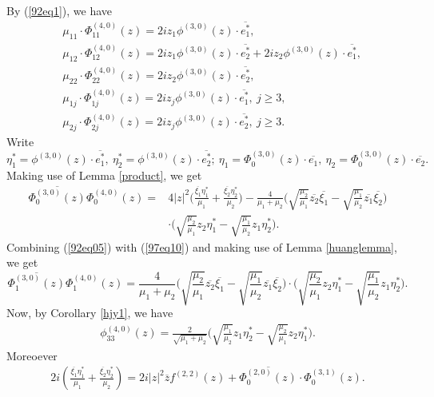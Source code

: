 \documentclass[12pt]{article}
\numberwithin{equation}{section}
\def\ov{\overline}
\begin{document}
By (\ref{92eq1}), we have
\begin{equation}\begin{split}\label{915eq1}
&\mu_{11}\cdot \Phi_{11}^{(4,0)}(z)=2iz_1\phi^{(3,0)}(z)\cdot \ov{e^*_1},\\
&\mu_{12}\cdot \Phi_{12}^{(4,0)}(z)=2iz_1\phi^{(3,0)}(z)\cdot \ov{e^*_2}+2iz_2\phi^{(3,0)}(z)\cdot \ov{e^*_1},\\
&\mu_{22}\cdot \Phi_{22}^{(4,0)}(z)=2iz_2\phi^{(3,0)}(z)\cdot \ov{e^*_2},\\
&\mu_{1j}\cdot \Phi_{1j}^{(4,0)}(z)=2iz_j\phi^{(3,0)}(z)\cdot \ov{e^*_1},\  j\ge 3,\\
&\mu_{2j}\cdot \Phi_{2j}^{(4,0)}(z)=2iz_j\phi^{(3,0)}(z)\cdot
\ov{e^*_2},\  j\ge 3.
\end{split}\end{equation}
Write
$$
\eta^*_1=\phi^{(3,0)}(z)\cdot \ov{e^*_1},\
\eta^*_2=\phi^{(3,0)}(z)\cdot \ov{e^*_2};\
\eta_1=\Phi_0^{(3,0)}(z)\cdot \ov{e_1},\
\eta_2=\Phi_0^{(3,0)}(z)\cdot \ov{e_2}.
$$
Making use of Lemma \ref{product}, we get
\begin{equation}\begin{split}\label{97eq10}
\ov{\Phi_0^{(3,0)}(z)}\Phi_0^{(4,0)}(z)
       =&4|z|^2\Big(\frac{\ov{\xi_1}\eta^*_1}{\mu_1}+\frac{\ov{\xi_2}\eta^*_2}{\mu_2}\Big)-\frac{4}{\mu_1+\mu_2}
        \Big(\sqrt{\frac{\mu_2}{\mu_1}}\ov{z_2}\ov{\xi_1}-\sqrt{\frac{\mu_1}{\mu_2}}\ov{z_1}\ov{\xi_2}\Big)\\&
        \cdot
         \Big(\sqrt{\frac{\mu_2}{\mu_1}}z_2\eta^*_1-\sqrt{\frac{\mu_1}{\mu_2}}z_1\eta^*_2\Big).
\end{split}\end{equation}
Combining (\ref{92eq05}) with (\ref{97eq10}) and making use of Lemma
\ref{huanglemma}, we get
\[
\ov{\Phi_{1}^{(3,0)}(z)}\Phi_{1}^{(4,0)}(z)=\frac{4}{\mu_1+\mu_2}
        \big(\sqrt{\frac{\mu_2}{\mu_1}}\ov{z_2}\ov{\xi_1}-\sqrt{\frac{\mu_1}{\mu_2}}\ov{z_1}\ov{\xi_2}\big)\cdot
         \big(\sqrt{\frac{\mu_2}{\mu_1}}z_2\eta^*_1-\sqrt{\frac{\mu_1}{\mu_2}}z_1\eta^*_2\big).
  \]
Now, by Corollary \ref{hjy1}, we have
\begin{equation}\begin{split}\label{99eq1}
\phi_{33}^{(4,0)}(z)=
\frac{2}{\sqrt{\mu_1+\mu_2}}\big(\sqrt{\frac{\mu_1}{\mu_2}}z_1\eta^*_2-\sqrt{\frac{\mu_2}{\mu_1}}z_2\eta^*_1\big).
\end{split}\end{equation}
Moreoever
\begin{equation}\begin{split}
2i(\frac{\ov{\xi_1}\eta^*_1}{\mu_1}+\frac{\ov{\xi_2}\eta^*_2}{\mu_2})
=2i|z|^2\ov{z}f^{(2,2)}(z)+\ov{\Phi_0^{(2,0)}(z)}\cdot\Phi_0^{(3,1)}(z).
\end{split}\end{equation}
\end{document}
